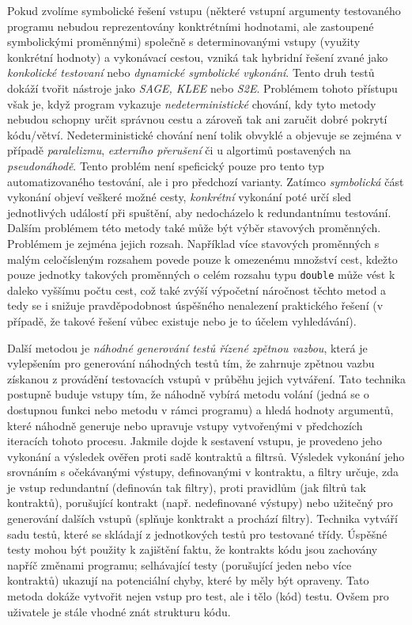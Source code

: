 \documentclass[czech, ma, kiv, he, iso690numb, pdf, viewonly]{fasthesis}
\begin{document}
        Pokud zvolíme symbolické řešení vstupu (některé vstupní argumenty testovaného programu nebudou reprezentovány konktrétními hodnotami, ale zastoupené symbolickými proměnnými) společně s determinovanými vstupy (využity konkrétní hodnoty) a vykonávací cestou, vzniká tak hybridní řešení zvané jako \emph{konkolické testovaní} nebo \emph{dynamické symbolické vykonání}. Tento druh testů dokáží tvořit nástroje jako \textit{SAGE, KLEE} nebo \textit{S2E}. Problémem tohoto přístupu však je, když program vykazuje \emph{nedeterministické} chování, kdy tyto metody nebudou schopny určit správnou cestu a zároveň tak ani zaručit dobré pokrytí kódu/větví. Nedeterministické chování není tolik obvyklé a objevuje se zejména v případě \textit{paralelizmu}, \textit{externího přerušení} či u algortimů postavených na \textit{pseudonáhodě}. \cite{nlab:nondeterministic_computation} Tento problém není speficický pouze pro tento typ automatizovaného testování, ale i pro předchozí varianty. Zatímco \emph{symbolická} část vykonání objeví veškeré možné cesty, \emph{konkrétní} vykonání poté určí sled jednotlivých událostí při spuštění, aby nedocházelo k redundantnímu testování. \cite{aldrich2019concolic} Dalším problémem této metody také může být výběr stavových proměnných. Problémem je zejména jejich rozsah. Například více stavových proměnných s malým celočísleným rozsahem povede pouze k omezenému množství cest, kdežto pouze jednotky takových proměnných o celém rozsahu typu \verb|double| může vést k daleko vyššímu počtu cest, což také zvýší výpočetní náročnost těchto metod a tedy se i snižuje pravděpodobnost úspěšného nenalezení praktického řešení (v případě, že takové řešení vůbec existuje nebo je to účelem vyhledávání). \cite{concolic_chalenges_2019} \cite{engler2006exe} \cite{sen2005cute} \cite{zhou2006safedrive}

        Další metodou je \textit{náhodné generování testů řízené zpětnou vazbou}, která je vylepšením pro generování náhodných testů tím, že zahrnuje zpětnou vazbu získanou z provádění testovacích vstupů v průběhu jejich vytváření. Tato technika postupně buduje vstupy tím, že náhodně vybírá metodu volání (jedná se o dostupnou funkci nebo metodu v rámci programu) a hledá hodnoty argumentů, které náhodně generuje nebo upravuje vstupy vytvořenými v předchozích iteracích tohoto procesu. Jakmile dojde k sestavení vstupu, je provedeno jeho vykonání a výsledek ověřen proti sadě \gls{kontrakt}ů a \glspl{filtr}ů. Výsledek vykonání jeho srovnáním s očekávanými výstupy, definovanými v kontraktu, a filtry určuje, zda je vstup redundantní (definován tak filtry), proti pravidlům (jak filtrů tak kontraktů), porušující \gls{kontrakt} (např. nedefinované výstupy) nebo užitečný pro generování dalších vstupů (splňuje konktrakt a prochází filtry). Technika vytváří sadu testů, které se skládají z jednotkových testů pro testované třídy. Úspěšné testy mohou být použity k zajištění faktu, že \glspl{kontrakt} kódu jsou zachovány napříč změnami programu; selhávající testy (porušující jeden nebo více kontraktů) ukazují na potenciální chyby, které by měly být opraveny. Tato metoda dokáže vytvořit nejen vstup pro test, ale i tělo (kód) testu. Ovšem pro uživatele je stále vhodné znát strukturu kódu. \cite{FeedbackDirectedRT}
\end{document}

